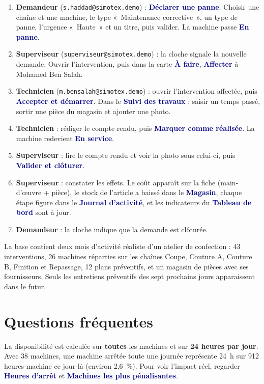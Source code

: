 \documentclass[11pt,a4paper]{article}
\newcommand{\ui}[1]{\textbf{\textcolor{navy}{#1}}}          %
\newcommand{\code}[1]{\texttt{\small #1}}                   %
\begin{document}
\begin{enumerate}
  \item \textbf{Demandeur} (\code{s.haddad@simotex.demo}) : \ui{Déclarer une panne}. Choisir une chaîne et une machine, le type «~Maintenance corrective~», un type de panne, l'urgence «~Haute~» et un titre, puis valider. La machine passe \ui{En panne}.
  \item \textbf{Superviseur} (\code{superviseur@simotex.demo}) : la cloche signale la nouvelle demande. Ouvrir l'intervention, puis dans la carte \ui{À faire}, \ui{Affecter} à Mohamed Ben Salah.
  \item \textbf{Technicien} (\code{m.bensalah@simotex.demo}) : ouvrir l'intervention affectée, puis \ui{Accepter et démarrer}. Dans le \ui{Suivi des travaux} : saisir un temps passé, sortir une pièce du magasin et ajouter une photo.
  \item \textbf{Technicien} : rédiger le compte rendu, puis \ui{Marquer comme réalisée}. La machine redevient \ui{En service}.
  \item \textbf{Superviseur} : lire le compte rendu et voir la photo sous celui-ci, puis \ui{Valider et clôturer}.
  \item \textbf{Superviseur} : constater les effets. Le coût apparaît sur la fiche (main-d'\oe uvre + pièce), le stock de l'article a baissé dans le \ui{Magasin}, chaque étape figure dans le \ui{Journal d'activité}, et les indicateurs du \ui{Tableau de bord} sont à jour.
  \item \textbf{Demandeur} : la cloche indique que la demande est clôturée.
\end{enumerate}

\begin{note}
La base contient deux mois d'activité réaliste d'un atelier de confection : 43 interventions, 26 machines réparties sur les chaînes Coupe, Couture A, Couture B, Finition et Repassage, 12 plans préventifs, et un magasin de pièces avec ses fournisseurs. Seuls les entretiens préventifs des sept prochains jours apparaissent dans le futur.
\end{note}

\section{Questions fréquentes}

\begin{retenir}
La disponibilité est calculée sur \textbf{toutes} les machines et sur \textbf{24 heures par jour}. Avec 38 machines, une machine arrêtée toute une journée représente 24~h sur 912 heures-machine ce jour-là (environ 2,6~\%). Pour voir l'impact réel, regarder \ui{Heures d'arrêt} et \ui{Machines les plus pénalisantes}.
\end{retenir}
\end{document}
